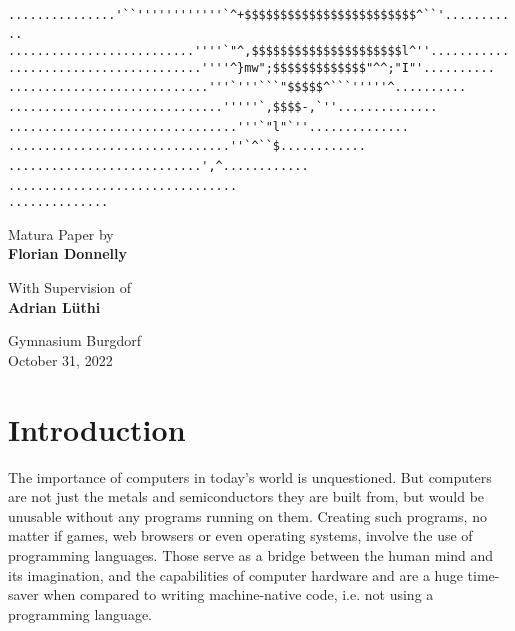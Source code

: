 \documentclass[12pt,a4paper]{article}
\begin{document}
\begin{titlepage}
\begin{center}
    \verb|  ...............'``''''''''''''`^+$$$$$$$$$$$$$$$$$$$$$$$$^``'...........  |\linebreak
    \verb|   ..........................''''`"^,$$$$$$$$$$$$$$$$$$$$$l^''...........   |\linebreak
    \verb|    ...........................''''^}mw";$$$$$$$$$$$$$"^^;"I"'..........    |\linebreak
    \verb|      ............................'''`'''```"$$$$$^```'''''^..........      |\linebreak
    \verb|        ..............................'''''`,$$$$-,`''..............        |\linebreak
    \verb|          ................................'''`"l"`''..............          |\linebreak
    \verb|             ...............................''`^``$............             |\linebreak
    \verb|                 ...........................',^............                 |\linebreak
    \verb|                      ................................                      |\linebreak
    \verb|                               ..............                               |\linebreak

    \Large
    \vspace{1.5cm}
    Matura Paper by\\ \textbf{Florian Donnelly}
    
    \vspace{0.5cm}
    With Supervision of\\ \textbf{Adrian Lüthi}

    \vfill
    Gymnasium Burgdorf\\ October 31, 2022

\end{center}\end{titlepage}


\tableofcontents\newpage

\newcommand{\name}{\emph{TestScript }}

\section{Introduction}
The importance of computers in today's world is unquestioned.
But computers are not just the metals and semiconductors they are built from,
but would be unusable without any programs running on them.
Creating such programs, no matter if games, web browsers or even operating systems,
involve the use of programming languages.
Those serve as a bridge between the human mind and its imagination, and
the capabilities of computer hardware and are a huge time-saver when compared
to writing machine-native code, i.e. not using a programming language.
\end{document}
